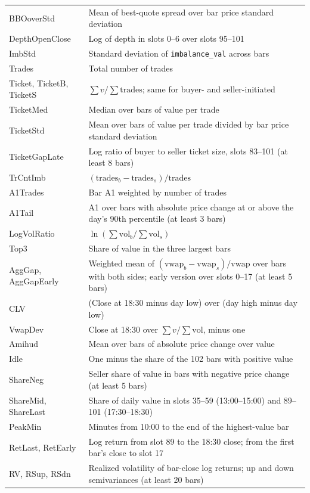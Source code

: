 \begin{longtable}{@{}R{3.0cm}p{12.6cm}@{}}
BBOoverStd & Mean of best-quote spread over bar price standard deviation \\
DepthOpenClose & Log of depth in slots 0--6 over slots 95--101 \\
ImbStd & Standard deviation of \texttt{imbalance\_val} across bars \\
Trades & Total number of trades \\
Ticket, TicketB, TicketS & $\sum v/\sum \text{trades}$; same for buyer- and seller-initiated \\
TicketMed & Median over bars of value per trade \\
TicketStd & Mean over bars of value per trade divided by bar price standard deviation \\
TicketGapLate & Log ratio of buyer to seller ticket size, slots 83--101 (at least 8 bars) \\
TrCntImb & $(\text{trades}_b-\text{trades}_s)/\text{trades}$ \\
A1Trades & Bar A1 weighted by number of trades \\
A1Tail & A1 over bars with absolute price change at or above the day's 90th percentile (at least 3 bars) \\
LogVolRatio & $\ln(\sum \text{vol}_b/\sum \text{vol}_s)$ \\
Top3 & Share of value in the three largest bars \\
AggGap, AggGapEarly & Weighted mean of $(\text{vwap}_b-\text{vwap}_s)/\text{vwap}$ over bars with both sides; early version over slots 0--17 (at least 5 bars) \\
CLV & (Close at 18:30 minus day low) over (day high minus day low) \\
VwapDev & Close at 18:30 over $\sum v/\sum \text{vol}$, minus one \\
Amihud & Mean over bars of absolute price change over value \\
Idle & One minus the share of the 102 bars with positive value \\
ShareNeg & Seller share of value in bars with negative price change (at least 5 bars) \\
ShareMid, ShareLast & Share of daily value in slots 35--59 (13:00--15:00) and 89--101 (17:30--18:30) \\
PeakMin & Minutes from 10:00 to the end of the highest-value bar \\
RetLast, RetEarly & Log return from slot 89 to the 18:30 close; from the first bar's close to slot 17 \\
RV, RSup, RSdn & Realized volatility of bar-close log returns; up and down semivariances (at least 20 bars) \\

\end{longtable}

